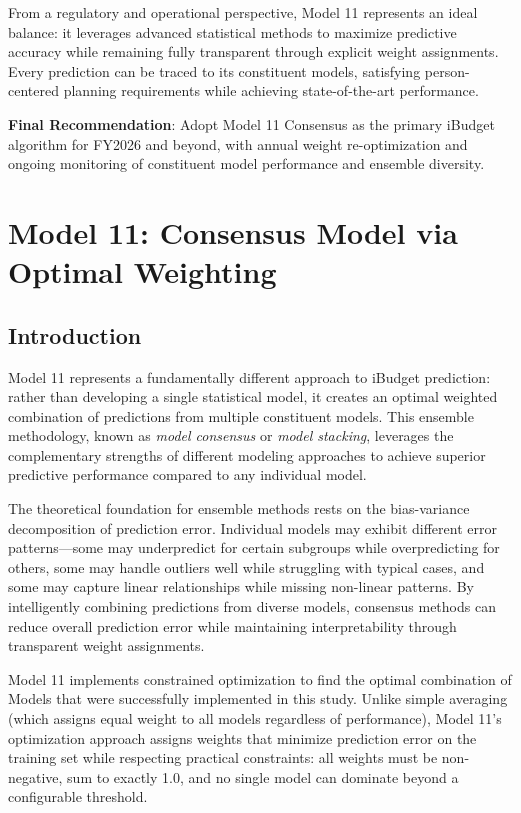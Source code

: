 From a regulatory and operational perspective, Model 11 represents an ideal balance: it leverages advanced statistical methods to maximize predictive accuracy while remaining fully transparent through explicit weight assignments. Every prediction can be traced to its constituent models, satisfying person-centered planning requirements while achieving state-of-the-art performance.

\textbf{Final Recommendation}: Adopt Model 11 Consensus as the primary iBudget algorithm for FY2026 and beyond, with annual weight re-optimization and ongoing monitoring of constituent model performance and ensemble diversity.\chapter{Model 11: Consensus Model via Optimal Weighting}

\section{Introduction}

Model 11 represents a fundamentally different approach to iBudget prediction: rather than developing a single statistical model, it creates an optimal weighted combination of predictions from multiple constituent models. This ensemble methodology, known as \textit{model consensus} or \textit{model stacking}, leverages the complementary strengths of different modeling approaches to achieve superior predictive performance compared to any individual model.

The theoretical foundation for ensemble methods rests on the bias-variance decomposition of prediction error. Individual models may exhibit different error patterns---some may underpredict for certain subgroups while overpredicting for others, some may handle outliers well while struggling with typical cases, and some may capture linear relationships while missing non-linear patterns. By intelligently combining predictions from diverse models, consensus methods can reduce overall prediction error while maintaining interpretability through transparent weight assignments.

Model 11 implements constrained optimization to find the optimal combination of Models \ModelElevenModelsIncluded{} that were successfully implemented in this study. Unlike simple averaging (which assigns equal weight to all models regardless of performance), Model 11's optimization approach assigns weights that minimize prediction error on the training set while respecting practical constraints: all weights must be non-negative, sum to exactly 1.0, and no single model can dominate beyond a configurable threshold.

